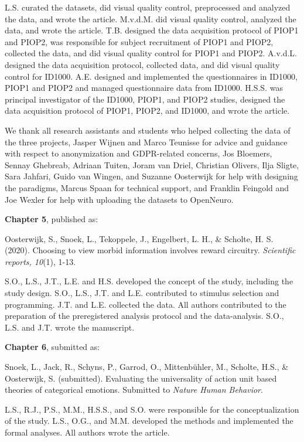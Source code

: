 \documentclass[11pt,american,a4paper,oneside,]{memoir} %
\begin{document}
L.S. curated the datasets, did visual quality control, preprocessed and analyzed the data, and wrote the article. M.v.d.M. did visual quality control, analyzed the data, and wrote the article. T.B. designed the data acquisition protocol of PIOP1 and PIOP2, was responsible for subject recruitment of PIOP1 and PIOP2, collected the data, and did visual quality control for PIOP1 and PIOP2. A.v.d.L. designed the data acquisition protocol, collected data, and did visual quality control for ID1000. A.E. designed and implemented the questionnaires in ID1000, PIOP1 and PIOP2 and managed questionnaire data from ID1000. H.S.S. was principal investigator of the ID1000, PIOP1, and PIOP2 studies, designed the data acquisition protocol of PIOP1, PIOP2, and ID1000, and wrote the article.

We thank all research assistants and students who helped collecting the data of the three projects, Jasper Wijnen and Marco Teunisse for advice and guidance with respect to anonymization and GDPR-related concerns, Jos Bloemers, Sennay Ghebreab, Adriaan Tuiten, Joram van Driel, Christian Olivers, Ilja Sligte, Sara Jahfari, Guido van Wingen, and Suzanne Oosterwijk for help with designing the paradigms, Marcus Spaan for technical support, and Franklin Feingold and Joe Wexler for help with uploading the datasets to OpenNeuro.

\textbf{Chapter 5}, published as:

Oosterwijk, S., Snoek, L., Tekoppele, J., Engelbert, L. H., \& Scholte, H. S. (2020). Choosing to view morbid information involves reward circuitry. \emph{Scientific reports, 10}(1), 1-13.

S.O., L.S., J.T., L.E. and H.S. developed the concept of the study, including the study design. S.O., L.S., J.T. and L.E. contributed to stimulus selection and programming. J.T. and L.E. collected the data. All authors contributed to the preparation of the preregistered analysis protocol and the data-analysis. S.O., L.S. and J.T. wrote the manuscript.

\textbf{Chapter 6}, submitted as:

Snoek, L., Jack, R., Schyns, P., Garrod, O., Mittenbühler, M., Scholte, H.S., \& Oosterwijk, S. (submitted). Evaluating the universality of action unit based theories of categorical emotions. Submitted to \emph{Nature Human Behavior}.

L.S., R.J., P.S., M.M., H.S.S., and S.O. were responsible for the conceptualization of the study. L.S., O.G., and M.M. developed the methods and implemented the formal analyses. All authors wrote the article.
\end{document}
